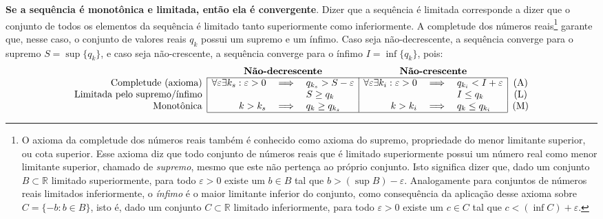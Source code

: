 \textbf{Se a sequência é monotônica e limitada,
        então ela é convergente}.
Dizer que a sequência é limitada
corresponde a dizer que o conjunto de todos os elementos da sequência
é limitado tanto superiormente como inferiormente.
A completude dos números reais\footnote{
  O axioma da completude dos números reais
  também é conhecido como axioma do supremo,
  propriedade do menor limitante superior,
  ou cota superior.
  Esse axioma diz que
  todo conjunto de números reais que é limitado superiormente
  possui um número real como menor limitante superior,
  chamado de \emph{supremo},
  mesmo que este não pertença ao próprio conjunto.
  Isto significa dizer que,
  dado um conjunto $B \subset \mathds{R}$ limitado superiormente,
  para todo $\varepsilon > 0$
  existe um $b \in B$
  tal que $b > (\sup B) - \varepsilon$.
  Analogamente
  para conjuntos de números reais limitados inferiormente,
  o \emph{ínfimo} é o maior limitante inferior do conjunto,
  como consequência da aplicação desse axioma
  sobre $C = \{-b: b \in B\}$,
  isto é,
  dado um conjunto $C \subset \mathds{R}$ limitado inferiormente,
  para todo $\varepsilon > 0$
  existe um $c \in C$
  tal que $c < (\inf C) + \varepsilon$.
} garante que, nesse caso, o conjunto de valores reais $q_k$
possui um supremo e um ínfimo.
Caso seja não-decrescente, a sequência converge para o supremo
$S = \sup \{q_k\}$,
e caso seja não-crescente, a sequência converge para o ínfimo
$I = \inf \{q_k\}$,
pois:
\[
  \begin{array}{r|rcl|rcl|c}
      \multicolumn{1}{r}{} &  %
      \multicolumn{3}{c}{\textbf{Não-decrescente}} &
      \multicolumn{3}{c}{\textbf{Não-crescente}}
    \\ \cline{2-7}
      \text{Completude (axioma)}
      &
      \forall \varepsilon \exists k_s :
        \varepsilon > 0 &\implies& q_{k_s} > S - \varepsilon
      &
      \forall \varepsilon \exists k_i :
        \varepsilon > 0 &\implies& q_{k_i} < I + \varepsilon
      & \text{(A)}
    \\
      \text{Limitada pelo supremo/ínfimo}
      &
      && S \ge q_k
      &
      && I \le q_k
      & \text{(L)}
    \\
      \text{Monotônica}
      &
      k > k_s &\implies& q_k \ge q_{k_s}
      &
      k > k_i &\implies& q_k \le q_{k_i}
      & \text{(M)}
    \\ \cline{2-7}
  \end{array}
\]
